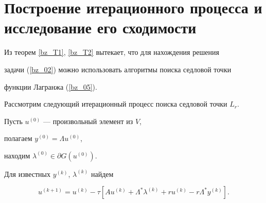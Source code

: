 




\section{Построение итерационного процесса и исследование его сходимости}





Из теорем \ref{bz_T1}, \ref{bz_T2} вытекает, что для нахождения решения


задачи (\ref{bz_02}) можно использовать алгоритмы поиска седловой точки


функции Лагранжа (\ref{bz_05}). 





Рассмотрим следующий итерационный процесс поиска седловой точки $L_r$.


Пусть $u^{(0)}$ --- произвольный элемент из $V$,


полагаем $y^{(0)}=\Lambda u^{(0)}$, 


находим $\lambda^{(0)} \in \partial G (u^{(0)})$.


Для известных $y^{(k)}$, $\lambda^{(k)}$ найдем 


\begin{equation}


u^{(k+1)}=u^{(k)}-\tau [{A u^{(k)}+\Lambda^* \lambda^{(k)}+


r u^{(k)}-r \Lambda^* y^{(k)}}] .


\label{2bz15}


\end{equation}


